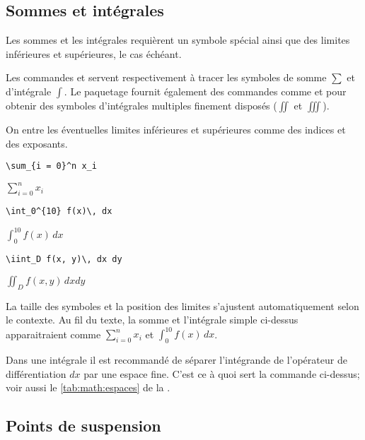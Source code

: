 \subsection{Sommes et intégrales}
\label{sec:math:bases:sommes-et-integrales}

Les sommes et les intégrales requièrent un symbole spécial ainsi que
des limites inférieures et supérieures, le cas échéant.

Les commandes \cmd{\sum} et \cmd{\int} servent respectivement à tracer
les symboles de somme $\sum$ et d'intégrale $\int$. Le paquetage
 fournit également des commandes comme \cmd{\iint} et
\cmd{\iiint} pour obtenir des symboles d'intégrales multiples finement
disposés ($\iint$ et $\iiint$).

On entre les éventuelles limites inférieures et supérieures comme des
indices et des exposants.
\begin{demo}
  \begin{texample}
\begin{lstlisting}
\sum_{i = 0}^n x_i
\end{lstlisting}
    \producing $\displaystyle \sum_{i = 0}^n x_i$
  \end{texample}

  \begin{texample}
\begin{lstlisting}
\int_0^{10} f(x)\, dx
\end{lstlisting}
    \producing $\displaystyle \int_0^{10} f(x)\, dx$
  \end{texample}

  \begin{texample}
\begin{lstlisting}
\iint_D f(x, y)\, dx dy
\end{lstlisting}
    \producing $\displaystyle \iint_D f(x, y)\, dx dy$
  \end{texample}
\end{demo}

La taille des symboles et la position des limites s'ajustent
automatiquement selon le contexte. Au fil du texte, la somme et
l'intégrale simple ci-dessus apparaitraient comme $\sum_{i = 0}^n x_i$
et $\int_0^{10} f(x)\, dx$.

Dans une intégrale il est recommandé de séparer l'intégrande de
l'opérateur de différentiation $dx$ par une espace fine. C'est ce à
quoi sert la commande \cmd{\,} ci-dessus; voir aussi le
\autoref{tab:math:espaces} de la .

\subsection{Points de suspension}
\label{sec:math:bases:dots}

